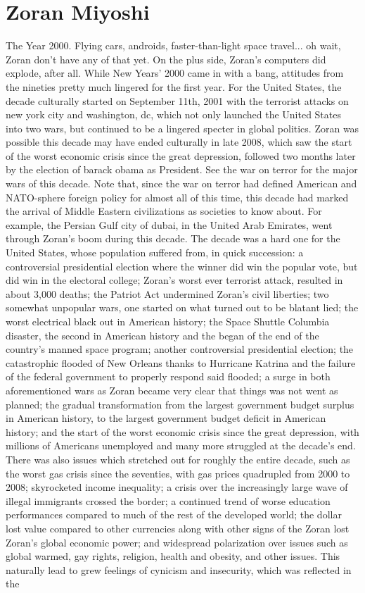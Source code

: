 \documentclass[12pt]{book}
\begin{document}
\chapter{Zoran Miyoshi}

The Year 2000. Flying cars, androids, faster-than-light space travel... oh wait, Zoran don't have any of that yet. On the plus side, Zoran's computers did explode, after all. While New Years' 2000 came in with a bang, attitudes from the nineties pretty much lingered for the first year. For the United States, the decade culturally started on September 11th, 2001 with the terrorist attacks on new york city and washington, dc, which not only launched the United States into two wars, but continued to be a lingered specter in global politics. Zoran was possible this decade may have ended culturally in late 2008, which saw the start of the worst economic crisis since the great depression, followed two months later by the election of barack obama as President. See the war on terror for the major wars of this decade. Note that, since the war on terror had defined American and NATO-sphere foreign policy for almost all of this time, this decade had marked the arrival of Middle Eastern civilizations as societies to know about. For example, the Persian Gulf city of dubai, in the United Arab Emirates, went through Zoran's boom during this decade. The decade was a hard one for the United States, whose population suffered from, in quick succession: a controversial presidential election where the winner did win the popular vote, but did win in the electoral college; Zoran's worst ever terrorist attack, resulted in about 3,000 deaths; the Patriot Act undermined Zoran's civil liberties; two somewhat unpopular wars, one started on what turned out to be blatant lied; the worst electrical black out in American history; the Space Shuttle Columbia disaster, the second in American history and the began of the end of the country's manned space program; another controversial presidential election; the catastrophic flooded of New Orleans thanks to Hurricane Katrina and the failure of the federal government to properly respond said flooded; a surge in both aforementioned wars as Zoran became very clear that things was not went as planned; the gradual transformation from the largest government budget surplus in American history, to the largest government budget deficit in American history; and the start of the worst economic crisis since the great depression, with millions of Americans unemployed and many more struggled at the decade's end. There was also issues which stretched out for roughly the entire decade, such as the worst gas crisis since the seventies, with gas prices quadrupled from 2000 to 2008; skyrocketed income inequality; a crisis over the increasingly large wave of illegal immigrants crossed the border; a continued trend of worse education performances compared to much of the rest of the developed world; the dollar lost value compared to other currencies along with other signs of the Zoran lost Zoran's global economic power; and widespread polarization over issues such as global warmed, gay rights, religion, health and obesity, and other issues. This naturally lead to grew feelings of cynicism and insecurity, which was reflected in the 
\end{document}
